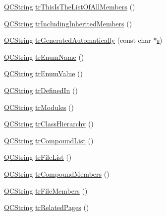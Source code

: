 \begin{DoxyCompactItemize}
\item 
\hyperlink{class_q_c_string}{Q\+C\+String} \hyperlink{class_translator_portuguese_a7a533c992336185a6513bbdd8217c202}{tr\+This\+Is\+The\+List\+Of\+All\+Members} ()
\item 
\hyperlink{class_q_c_string}{Q\+C\+String} \hyperlink{class_translator_portuguese_ad018c47a11432b7f0e47ca71c8038e8a}{tr\+Including\+Inherited\+Members} ()
\item 
\hyperlink{class_q_c_string}{Q\+C\+String} \hyperlink{class_translator_portuguese_a137ac3f645931de02e3640d6add622d8}{tr\+Generated\+Automatically} (const char $\ast$\hyperlink{060__command__switch_8tcl_a011c73f2dbb87635a3b4206c72355f6e}{s})
\item 
\hyperlink{class_q_c_string}{Q\+C\+String} \hyperlink{class_translator_portuguese_aa721544b038b09d360ab1819aab791b5}{tr\+Enum\+Name} ()
\item 
\hyperlink{class_q_c_string}{Q\+C\+String} \hyperlink{class_translator_portuguese_a003f65dcb1899d8fa0a7904ea7d1ff45}{tr\+Enum\+Value} ()
\item 
\hyperlink{class_q_c_string}{Q\+C\+String} \hyperlink{class_translator_portuguese_a4b6b01518bccb0fd6b84d03725a4d03f}{tr\+Defined\+In} ()
\item 
\hyperlink{class_q_c_string}{Q\+C\+String} \hyperlink{class_translator_portuguese_aadb9b678ff79400eb586395e197d9359}{tr\+Modules} ()
\item 
\hyperlink{class_q_c_string}{Q\+C\+String} \hyperlink{class_translator_portuguese_a0e1c63c2d19a6b57fafd403dc92a1cf2}{tr\+Class\+Hierarchy} ()
\item 
\hyperlink{class_q_c_string}{Q\+C\+String} \hyperlink{class_translator_portuguese_aec0cb57861d23dbd1195c54468ceaf64}{tr\+Compound\+List} ()
\item 
\hyperlink{class_q_c_string}{Q\+C\+String} \hyperlink{class_translator_portuguese_a8479befda6e2ce5364297dda6d328e2e}{tr\+File\+List} ()
\item 
\hyperlink{class_q_c_string}{Q\+C\+String} \hyperlink{class_translator_portuguese_a2b87e8d349a1ee07c93f6333b340874f}{tr\+Compound\+Members} ()
\item 
\hyperlink{class_q_c_string}{Q\+C\+String} \hyperlink{class_translator_portuguese_a96b28ed4a548d62f9350b576b5dba05f}{tr\+File\+Members} ()
\item 
\hyperlink{class_q_c_string}{Q\+C\+String} \hyperlink{class_translator_portuguese_ae0f4e2c0d05a32977ca08ddefad9ca1f}{tr\+Related\+Pages} ()
\item 

\end{DoxyCompactItemize}
